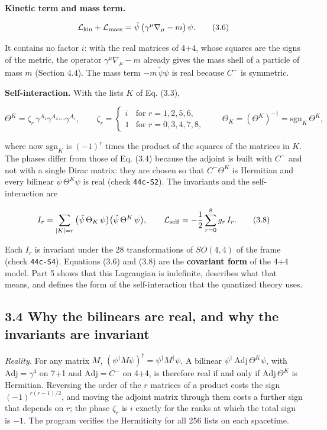 \documentclass[
  10pt,
]{article}
\begin{document}
\textbf{Kinetic term and mass term.}

\[\mathcal L_{\rm kin}+\mathcal L_{\rm mass}=\tilde\psi\,\big(\gamma^\mu\nabla_\mu-m\big)\,\psi.\tag{3.6}\]

It contains no factor \(i\): with the real matrices of 4+4, whose
squares are the signs of the metric, the operator
\(\gamma^\mu\nabla_\mu-m\) already gives the mass shell of a particle of
mass \(m\) (Section 4.4). The mass term \(-m\,\tilde\psi\psi\) is real
because \(C^-\) is symmetric.

\textbf{Self-interaction.} With the lists \(K\) of Eq. (3.3),

\[\Theta^K=\zeta_r\,\gamma^{A_1}\gamma^{A_2}\cdots\gamma^{A_r},\qquad
\zeta_r=\begin{cases}i&\text{for }r=1,2,5,6,\\1&\text{for }r=0,3,4,7,8,\end{cases}
\qquad\Theta_K=(\Theta^K)^{-1}=\mathrm{sgn}_K\,\Theta^K,\tag{3.7}\]

where now \(\mathrm{sgn}_K\) is \((-1)^r\) times the product of the
squares of the matrices in \(K\). The phases differ from those of Eq.
(3.4) because the adjoint is built with \(C^-\) and not with a single
Dirac matrix: they are chosen so that \(C^-\Theta^K\) is Hermitian and
every bilinear \(\tilde\psi\,\Theta^K\psi\) is real (check
\texttt{44c-S2}). The invariants and the self-interaction are

\[I_r=\sum_{|K|=r}\big(\tilde\psi\,\Theta_K\,\psi\big)\big(\tilde\psi\,\Theta^K\,\psi\big),\qquad
\mathcal L_{\rm self}=-\frac12\sum_{r=0}^{8}g_r\,I_r.\tag{3.8}\]

Each \(I_r\) is invariant under the 28 transformations of \(SO(4,4)\) of
the frame (check \texttt{44c-S4}). Equations (3.6) and (3.8) are the
\textbf{covariant form} of the 4+4 model. Part 5 shows that this
Lagrangian is indefinite, describes what that means, and defines the
form of the self-interaction that the quantized theory uses.

\hypertarget{why-the-bilinears-are-real-and-why-the-invariants-are-invariant}{%
\subsection{3.4 Why the bilinears are real, and why the invariants are
invariant}\label{why-the-bilinears-are-real-and-why-the-invariants-are-invariant}}

\emph{Reality.} For any matrix \(M\),
\((\psi^\dagger M\psi)^\dagger=\psi^\dagger M^\dagger\psi\). A bilinear
\(\psi^\dagger\,\mathrm{Adj}\,\Theta^K\psi\), with
\(\mathrm{Adj}=\gamma^4\) on 7+1 and \(\mathrm{Adj}=C^-\) on 4+4, is
therefore real if and only if \(\mathrm{Adj}\,\Theta^K\) is Hermitian.
Reversing the order of the \(r\) matrices of a product costs the sign
\((-1)^{r(r-1)/2}\), and moving the adjoint matrix through them costs a
further sign that depends on \(r\); the phase \(\zeta_r\) is \(i\)
exactly for the ranks at which the total sign is \(-1\). The program
verifies the Hermiticity for all 256 lists on each spacetime.
\end{document}
